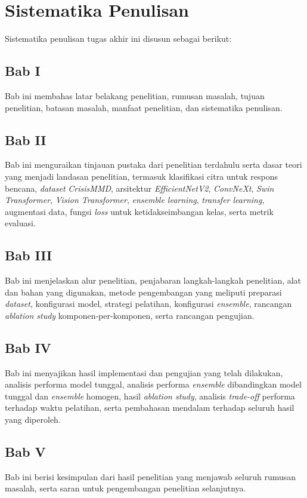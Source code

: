 \section{Sistematika Penulisan} \label{I.Sistematika}
Sistematika penulisan tugas akhir ini disusun sebagai berikut: \par

\subsection*{Bab I}
Bab ini membahas latar belakang penelitian, rumusan masalah, tujuan
penelitian, batasan masalah, manfaat penelitian, dan sistematika
penulisan. \par

\subsection*{Bab II}
Bab ini menguraikan tinjauan pustaka dari penelitian terdahulu serta
dasar teori yang menjadi landasan penelitian, termasuk klasifikasi
citra untuk respons bencana, \textit{dataset} \textit{CrisisMMD},
arsitektur \textit{EfficientNetV2}, \textit{ConvNeXt}, \textit{Swin
Transformer}, \textit{Vision Transformer}, \textit{ensemble learning},
\textit{transfer learning}, augmentasi data, fungsi \textit{loss} untuk
ketidakseimbangan kelas, serta metrik evaluasi. \par

\subsection*{Bab III}
Bab ini menjelaskan alur penelitian, penjabaran langkah-langkah
penelitian, alat dan bahan yang digunakan, metode pengembangan yang
meliputi preparasi \textit{dataset}, konfigurasi model, strategi
pelatihan, konfigurasi \textit{ensemble}, rancangan \textit{ablation
study} komponen-per-komponen, serta rancangan pengujian. \par

\subsection*{Bab IV}
Bab ini menyajikan hasil implementasi dan pengujian yang telah
dilakukan, analisis performa model tunggal, analisis performa
\textit{ensemble} dibandingkan model tunggal dan \textit{ensemble}
homogen, hasil \textit{ablation study}, analisis \textit{trade-off}
performa terhadap waktu pelatihan, serta pembahasan mendalam terhadap
seluruh hasil yang diperoleh. \par

\subsection*{Bab V}
Bab ini berisi kesimpulan dari hasil penelitian yang menjawab seluruh
rumusan masalah, serta saran untuk pengembangan penelitian
selanjutnya. \par
